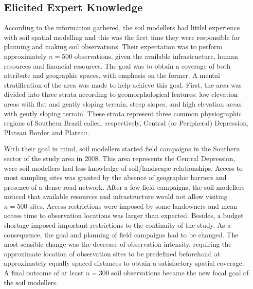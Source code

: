 \subsection{Elicited Expert Knowledge}

According to the information gathered, the soil modellers had littlel experience with soil spatial 
modelling and this was the first time they were responsible for planning and making soil observations. Their 
expectation was to perform approximately $n = 500$ observations, given the available infrastructure, human 
resources and financial resources. The goal was to obtain a  coverage of both attribute and 
geographic spaces, with emphasis on the former. A mental stratification of the area was made to help achieve 
this goal. First, the area was divided into three strata according to geomorphological features: low elevation 
areas with flat and gently sloping terrain, steep slopes, and high elevation areas with gently sloping 
terrain. These strata represent three common physiographic regions of Southern Brazil called, respectively, 
Central (or Peripheral) Depression, Plateau Border and Plateau.

With their goal in mind, soil modellers started field campaigns in the Southern sector of the study area in 
\num{2008}. This area represents the Central Depression, were soil modellers had less knowledge of 
soil\-/landscape relationships. Access to most sampling sites was granted by the absence of geographic 
barriers and presence of a dense road network. After a few field campaigns, the soil modellers noticed that 
available resources and infrastructure would not allow visiting $n = 500$ sites. Access restrictions were 
imposed by some landowners and mean access time to observation locations was larger than expected. Besides, a 
budget shortage imposed important restrictions to the continuity of the study. As a consequence, the goal and 
planning of field campaigns had to be changed. The most sensible change was the decrease of observation 
intensity, requiring the approximate location of observation sites to be predefined beforehand at 
approximately equally spaced distances to obtain a satisfactory spatial coverage. A final outcome of at least 
$n = 300$ soil observations became the new focal goal of the soil modellers.


